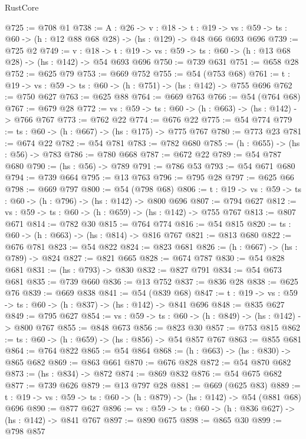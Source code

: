 \begin{lexlean}{RustCore}
\begin{coremodule}
@725 := @708 @1
@738 := {A : @26} ->
  {v : @18} ->
  {t : @19} -> {vs : @59} -> {ts : @60} -> (h : @12 @88 @68 @28) -> (hs : @129) -> @48 @66 @693 @696
@739 := @725 @2
@749 := {v : @18} ->
  {t : @19} -> {vs : @59} -> {ts : @60} -> (h : @13 @68 @28) -> (hs : @142) -> @54 @693 @696
@750 := @739 @631
@751 := @658 @28
@752 := @625 @79
@753 := @669 @752
@755 := @54 (@753 @68)
@761 := {t : @19} -> {vs : @59} -> {ts : @60} -> (h : @751) -> (hs : @142) -> @755 @696
@762 := @750 @627
@763 := @625 @88
@764 := @669 @763
@766 := @54 (@764 @68)
@767 := @679 @28
@772 := {vs : @59} -> {ts : @60} -> (h : @663) -> (hs : @142) -> @766 @767
@773 := @762 @22
@774 := @676 @22
@775 := @54 @774
@779 := {ts : @60} -> (h : @667) -> (hs : @175) -> @775 @767
@780 := @773 @23
@781 := @674 @22
@782 := @54 @781
@783 := @782 @680
@785 := (h : @655) -> (hs : @56) -> @783
@786 := @780 @668
@787 := @672 @22
@789 := @54 @787 @680
@790 := (hs : @56) -> @789
@791 := @786 @53
@793 := @54 @671 @680
@794 := @739 @664
@795 := @13 @763
@796 := @795 @28
@797 := @625 @66
@798 := @669 @797
@800 := @54 (@798 @68)
@806 := {t : @19} -> {vs : @59} -> {ts : @60} -> (h : @796) -> (hs : @142) -> @800 @696
@807 := @794 @627
@812 := {vs : @59} -> {ts : @60} -> (h : @659) -> (hs : @142) -> @755 @767
@813 := @807 @671
@814 := @782 @30
@815 := @764 @774
@816 := @54 @815
@820 := {ts : @60} -> (h : @663) -> (hs : @814) -> @816 @767
@821 := @813 @680
@822 := @676 @781
@823 := @54 @822
@824 := @823 @681
@826 := (h : @667) -> (hs : @789) -> @824
@827 := @821 @665
@828 := @674 @787
@830 := @54 @828 @681
@831 := (hs : @793) -> @830
@832 := @827 @791
@834 := @54 @673 @681
@835 := @739 @660
@836 := @13 @752
@837 := @836 @28
@838 := @625 @76
@839 := @669 @838
@841 := @54 (@839 @68)
@847 := {t : @19} -> {vs : @59} -> {ts : @60} -> (h : @837) -> (hs : @142) -> @841 @696
@848 := @835 @627
@849 := @795 @627
@854 := {vs : @59} -> {ts : @60} -> (h : @849) -> (hs : @142) -> @800 @767
@855 := @848 @673
@856 := @823 @30
@857 := @753 @815
@862 := {ts : @60} -> (h : @659) -> (hs : @856) -> @54 @857 @767
@863 := @855 @681
@864 := @764 @822
@865 := @54 @864
@868 := (h : @663) -> (hs : @830) -> @865 @682
@869 := @863 @661
@870 := @676 @828
@872 := @54 @870 @682
@873 := (hs : @834) -> @872
@874 := @869 @832
@876 := @54 @675 @682
@877 := @739 @626
@879 := @13 @797 @28
@881 := @669 (@625 @83)
@889 := {t : @19} -> {vs : @59} -> {ts : @60} -> (h : @879) -> (hs : @142) -> @54 (@881 @68) @696
@890 := @877 @627
@896 := {vs : @59} -> {ts : @60} -> (h : @836 @627) -> (hs : @142) -> @841 @767
@897 := @890 @675
@898 := @865 @30
@899 := @798 @857

\end{coremodule}
\end{lexlean}
